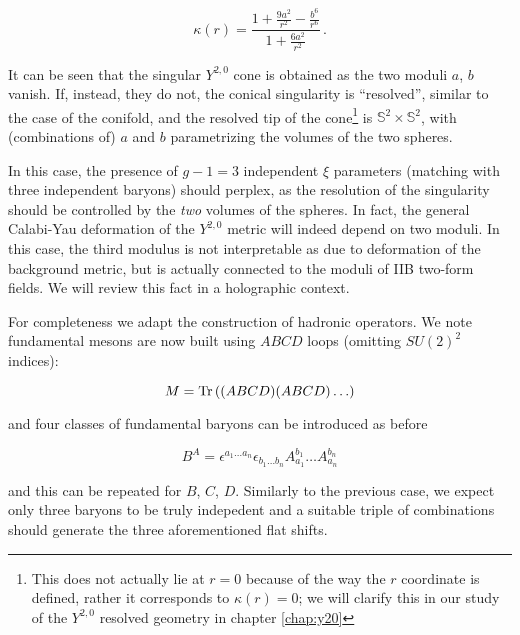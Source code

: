 \begin{equation}
	\kappa(r) = \frac{1 + \frac{9a^2}{r^2} - \frac{b^6}{r^6}}{1 + \frac{6a^2}{r^2}}\,.
	\label{}
\end{equation}

It can be seen that the singular $Y^{2,0}$ cone is obtained as the two moduli $a$, $b$ vanish. If, instead, they do not, the conical singularity is ``resolved'', similar to the case of the conifold, and the resolved tip of the cone\footnote{This does not actually lie at $r=0$ because of the way the $r$ coordinate is defined, rather it corresponds to $\kappa(r) = 0$; we will clarify this in our study of the $Y^{2,0}$ resolved geometry in chapter \ref{chap:y20}} is $\mathbb{S}^2 \times \mathbb{S}^2$, with (combinations of) $a$ and $b$ parametrizing the volumes of the two spheres.

In this case, the presence of $g-1 = 3$ independent $\xi$ parameters (matching with three independent baryons) should perplex, as the resolution of the singularity should be controlled by the \emph{two} volumes of the spheres. In fact, the general Calabi-Yau deformation of the $Y^{2,0}$ metric will indeed depend on two moduli. In this case, the third modulus is not interpretable as due to deformation of the background metric, but is actually connected to the moduli of IIB two-form fields. We will review this fact in a holographic context.

For completeness we adapt the construction of hadronic operators. We note fundamental mesons are now built using $ABCD$ loops (omitting $SU(2)^2$ indices):

\begin{equation}
	M = \operatorname{Tr} \left( (ABCD)(ABCD) \ldots \right)
	\label{}
\end{equation}

and four classes of fundamental baryons can be introduced as before

\begin{equation}
	B^A = \epsilon^{a_1\ldots a_n}\epsilon_{b_1 \ldots b_n} A^{b_1}_{a_1} \ldots A^{b_n}_{a_n}
	\label{}
\end{equation}

and this can be repeated for $B$, $C$, $D$. Similarly to the previous case, we expect only three baryons to be truly indepedent and a suitable triple of combinations should generate the three aforementioned flat shifts.



